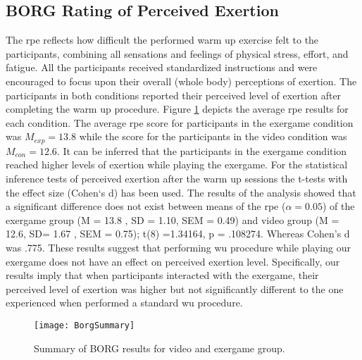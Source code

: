 \subsection{BORG Rating of Perceived Exertion}
The \acrfull{rpe} reflects how difficult the performed warm up exercise felt to the participants, combining all sensations and feelings of physical stress, effort, and fatigue. All the participants received standardized instructions and were encouraged to focus upon their overall (whole body) perceptions of exertion. The participants in both conditions reported their perceived level of exertion after completing the warm up procedure.  Figure \ref{fig:borg} depicts the average \gls{rpe}  results for each condition. The average \gls{rpe} score for participants in the exergame condition was   \begin{math}M_{exp} = 13.8 \end{math} while the score for the participants in the video condition was   \begin{math}M_{con} = 12.6 \end{math}. It can be inferred that the participants in the exergame condition reached higher levels of exertion while playing the exergame. For the statistical inference tests of perceived exertion after the warm up sessions the t-tests with the effect size (Cohen`s d) has been used. The results of the analysis showed that a significant difference does not exist  between means of the \gls{rpe} (\begin{math}\alpha = 0.05\end{math})  of the exergame group (M = 13.8 , SD = 1.10, SEM = 0.49) and video group (M = 12.6, SD= 1.67 , SEM = 0.75);  t(8) =1.34164, p = .108274. Whereas Cohen's d was .775. These results suggest that performing \acrshort{wu} procedure while playing our exergame does not have an effect on perceived exertion level. Specifically, our results imply that when participants interacted with the exergame, their perceived level of exertion was higher but not significantly different to the one experienced when performed a standard \acrshort{wu} procedure.\\
\begin{figure}[h]
    \centering
    \texttt{[image: BorgSummary]}
    \caption{Summary of BORG results for video and exergame group.}
    \label{fig:borg}
\end{figure}
